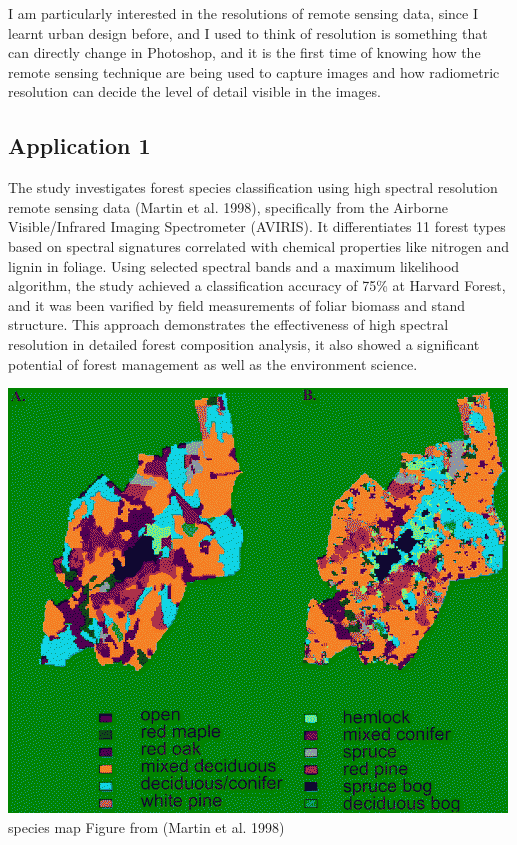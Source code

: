 \documentclass[
  letterpaper,
  DIV=11,
  numbers=noendperiod]{scrreprt}
\begin{document}
I am particularly interested in the resolutions of remote sensing data,
since I learnt urban design before, and I used to think of resolution is
something that can directly change in Photoshop, and it is the first
time of knowing how the remote sensing technique are being used to
capture images and how radiometric resolution can decide the level of
detail visible in the images.

\subsection{Application 1}\label{application-1}

The study investigates forest species classification using high spectral
resolution remote sensing data (Martin et al. 1998), specifically from
the Airborne Visible/Infrared Imaging Spectrometer (AVIRIS). It
differentiates 11 forest types based on spectral signatures correlated
with chemical properties like nitrogen and lignin in foliage. Using
selected spectral bands and a maximum likelihood algorithm, the study
achieved a classification accuracy of 75\% at Harvard Forest, and it was
been varified by field measurements of foliar biomass and stand
structure. This approach demonstrates the effectiveness of high spectral
resolution in detailed forest composition analysis, it also showed a
significant potential of forest management as well as the environment
science.

\includegraphics{spectral_resolution.jpg} species map Figure from
(Martin et al. 1998)
\end{document}

